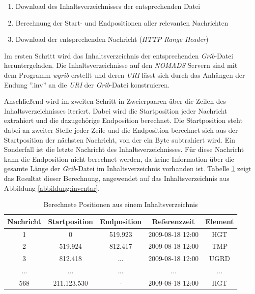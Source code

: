 \begin{enumerate}
\item Download des Inhaltsverzeichnisses der entsprechenden Datei
\item Berechnung der Start- und Endpositionen aller relevanten Nachrichten
\item Download der entsprechenden Nachricht (\textit{HTTP Range Header})
\end{enumerate}

Im ersten Schritt wird das Inhaltsverzeichnis der entsprechenden
\textit{Grib}-Datei heruntergeladen. Die Inhaltsverzeichnisse auf den
\textit{NOMADS} Servern sind mit dem Programm \textit{wgrib} erstellt
und deren \textit{URI} lässt sich durch das Anhängen der Endung
''.inv'' an die \textit{URI} der \textit{Grib}-Datei konstruieren.

Anschließend wird im zweiten Schritt in Zweierpaaren über die Zeilen
des Inhaltsverzeichnisses iteriert. Dabei wird die Startposition jeder
Nachricht extrahiert und die dazugehörige Endposition berechnet. Die
Startposition steht dabei an zweiter Stelle jeder Zeile und die
Endposition berechnet sich aus der Startposition der nächsten
Nachricht, von der ein Byte subtrahiert wird. Ein Sonderfall ist die
letzte Nachricht des Inhaltsverzeichnisses. Für diese Nachricht kann
die Endposition nicht berechnet werden, da keine Information über die
gesamte Länge der \textit{Grib}-Datei im Inhaltsverzeichnis vorhanden
ist. Tabelle \ref{tab:inhaltsverzeichnis_mit_positionen} zeigt das
Resultat dieser Berechnung, angewendet auf das Inhaltsverzeichnis aus
Abbildung \ref{abbildung:inventar}.

\begin{table}[h]
  \centering
  {\sf
    \footnotesize
    \begin{longtable}{@{}ccccc}
      \toprule
      \textbf{Nachricht} & \textbf{Startposition} & \textbf{Endposition} & \textbf{Referenzzeit} & \textbf{Element} \\
      \midrule
      1 & 0 & 519.923 & 2009-08-18 12:00 & HGT \\
      2 & 519.924 & 812.417 & 2009-08-18 12:00 & TMP \\
      3 & 812.418 & ... & 2009-08-18 12:00 & UGRD \\
      ... & ... & ... & ... & ... \\
      568 & 211.123.530 & - & 2009-08-18 12:00 & HGT \\
      \bottomrule
    \end{longtable}
  }

  \caption{Berechnete Positionen aus einem Inhaltsverzeichnis}
  \label{tab:inhaltsverzeichnis_mit_positionen}

\end{table}

